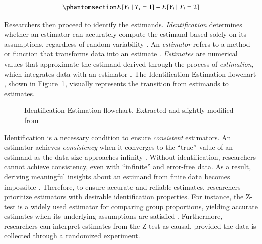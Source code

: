 \documentclass[
  authoryear,
  review,
  1p]{elsarticle}
\begin{document}
\begin{equation}\phantomsection\label{eq-group_diff}{
E[Y_{i} \mid T_{i}=1] - E[Y_{i} \mid T_{i}=2]
}\end{equation}

Researchers then proceed to identify the estimands.
\emph{Identification} determines whether an estimator can accurately
compute the estimand based solely on its assumptions, regardless of
random variability \citep[pp.~4]{Schuessler_et_al_2023}. An
\emph{estimator} refers to a method or function that transforms data
into an estimate \citep{Neal_2020}. \emph{Estimates} are numerical
values that approximate the estimand derived through the process of
\emph{estimation}, which integrates data with an estimator
\citep{Everitt_et_al_2010}. The Identification-Estimation flowchart
\citep{McElreath_2020, Neal_2020}, shown in Figure~\ref{fig-IEflow},
visually represents the transition from estimands to estimates.

\begin{figure}


\caption{\label{fig-IEflow}Identification-Estimation flowchart.
Extracted and slightly modified from \citet[pp.~32]{Neal_2020}}

\end{figure}%

Identification is a necessary condition to ensure \emph{consistent}
estimators. An estimator achieves \emph{consistency} when it converges
to the ``true'' value of an estimand as the data size approaches
infinity \citep{Everitt_et_al_2010}. Without identification, researchers
cannot achieve consistency, even with ``infinite'' and error-free data.
As a result, deriving meaningful insights about an estimand from finite
data becomes impossible \citep[pp.~5]{Schuessler_et_al_2023}. Therefore,
to ensure accurate and reliable estimates, researchers prioritize
estimators with desirable identification properties. For instance, the
Z-test is a widely used estimator for comparing group proportions,
yielding accurate estimates when its underlying assumptions are
satisfied \citep{Kanji_2006}. Furthermore, researchers can interpret
estimates from the Z-test as causal, provided the data is collected
through a randomized experiment.
\end{document}
